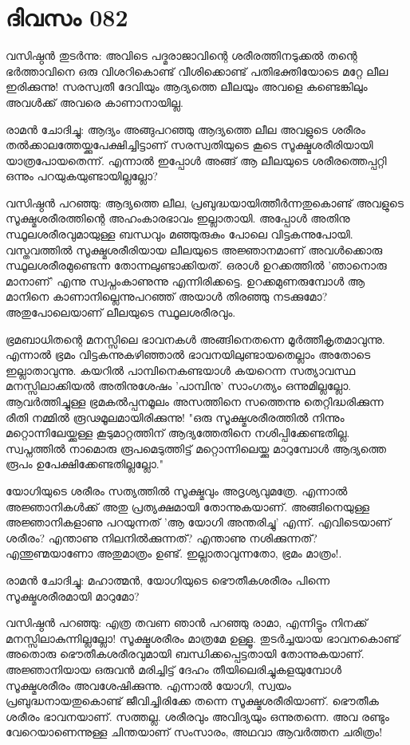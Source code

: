  
\section{ദിവസം 082}


വസിഷ്ഠന്‍ തുടര്‍ന്നു: അവിടെ പദ്മരാജാവിന്റെ ശരീരത്തിനടുക്കല്‍ തന്റെ ഭര്‍ത്താവിനെ ഒരു വിശറികൊണ്ട്‌ വീശിക്കൊണ്ട്‌ പതിഭക്തിയോടെ മറ്റേ ലീല ഇരിക്കുന്നു! സരസ്വതീ ദേവിയും ആദ്യത്തെ ലീലയും അവളെ കണ്ടെങ്കിലും അവള്‍ക്ക്‌ അവരെ കാണാനായില്ല.

രാമന്‍ ചോദിച്ചു: ആദ്യം അങ്ങുപറഞ്ഞു ആദ്യത്തെ ലീല അവളുടെ ശരീരം തല്‍ക്കാലത്തേയ്ക്കുപേക്ഷിച്ചിട്ടാണ്‌ സരസ്വതിയുടെ കൂടെ സൂക്ഷ്മശരീരിയായി യാത്രപോയതെന്ന്. എന്നാല്‍ ഇപ്പോള്‍ അങ്ങ്‌ ആ ലീലയുടെ ശരീരത്തെപ്പറ്റി ഒന്നും പറയുകയുണ്ടായില്ലല്ലോ?

വസിഷ്ഠന്‍ പറഞ്ഞു: ആദ്യത്തെ ലീല, പ്രബുദ്ധയായിത്തീര്‍ന്നതുകൊണ്ട്‌ അവളുടെ സൂക്ഷ്മശരീരത്തിന്റെ അഹംകാരഭാവം ഇല്ലാതായി. അപ്പോള്‍ അതിനു സ്ഥൂലശരീരവുമായുള്ള ബന്ധവും മഞ്ഞുരുകും പോലെ വിട്ടകന്നുപോയി. വസ്തവത്തില്‍ സൂക്ഷ്മശരീരിയായ ലീലയുടെ അജ്ഞാനമാണ്‌ അവള്‍ക്കൊരു സ്ഥൂലശരീരമുണ്ടെന്ന തോന്നലുണ്ടാക്കിയത്‌. ഒരാള്‍ ഉറക്കത്തില്‍ 'ഞാനൊരു മാനാണ്‌' എന്നു സ്വപ്നംകാണുന്നു എന്നിരിക്കട്ടെ. ഉറക്കമുണരുമ്പോള്‍ ആ മാനിനെ കാണാനില്ലെന്നുപറഞ്ഞ്‌ അയാള്‍ തിരഞ്ഞു നടക്കുമോ? അതുപോലെയാണ്‌ ലീലയുടെ സ്ഥൂലശരീരവും.

ഭ്രമബാധിതന്റെ മനസ്സിലെ ഭാവനകള്‍ അങ്ങിനെതന്നെ മൂര്‍ത്തീകൃതമാവുന്നു. എന്നാല്‍ ഭ്രമം വിട്ടകന്നുകഴിഞ്ഞാല്‍ ഭാവനയിലുണ്ടായതെല്ലാം അതോടെ ഇല്ലാതാവുന്നു. കയറില്‍ പാമ്പിനെകണ്ടയാള്‍ കയറെന്ന സത്യാവസ്ഥ മനസ്സിലാക്കിയല്‍ അതിനുശേഷം 'പാമ്പിനു' സാംഗത്യം ഒന്നുമില്ലല്ലോ. ആവര്‍ത്തിച്ചുള്ള ഭ്രമകല്‍പ്പനമൂലം അസത്തിനെ സത്തെന്നു തെറ്റിദ്ധരിക്കുന്ന രീതി നമ്മില്‍ രൂഢമൂലമായിരിക്കുന്നു! "ഒരു സൂക്ഷ്മശരീരത്തില്‍ നിന്നും മറ്റൊന്നിലേയ്ക്കുള്ള കൂടുമാറ്റത്തിന്‌ ആദ്യത്തേതിനെ നശിപ്പിക്കേണ്ടതില്ല. സ്വപ്നത്തില്‍ നാമൊരു രൂപമെടുത്തിട്ട്‌ മറ്റൊന്നിലെയ്ക്കു മാറുമ്പോള്‍ ആദ്യത്തെ രൂപം ഉപേക്ഷിക്കേണ്ടതില്ലല്ലോ." 

യോഗിയുടെ ശരീരം സത്യത്തില്‍  സൂക്ഷ്മവും അദൃശ്യവുമത്രേ. എന്നാല്‍ അജ്ഞാനികള്‍ക്ക്‌ അതു പ്രത്യക്ഷമായി തോന്നുകയാണ്‌. അങ്ങിനെയുള്ള അജ്ഞാനികളാണു പറയുന്നത്‌ 'ആ യോഗി അന്തരിച്ചു' എന്ന്. എവിടെയാണ്‌ ശരീരം? എന്താണു നിലനില്‍ക്കുന്നത്‌? എന്താണു നശിക്കുന്നത്‌? എന്തുണ്മയാണോ അതുമാത്രം ഉണ്ട്‌. ഇല്ലാതാവുന്നതോ, ഭ്രമം മാത്രം!.

രാമന്‍ ചോദിച്ചു: മഹാത്മന്‍, യോഗിയുടെ ഭൌതീകശരീരം പിന്നെ സൂക്ഷ്മശരീരമായി മാറുമോ? 

വസിഷ്ഠന്‍ പറഞ്ഞു: എത്ര തവണ ഞാന്‍ പറഞ്ഞു രാമാ, എന്നിട്ടും നിനക്ക്‌ മനസ്സിലാകുന്നില്ലല്ലോ! സൂക്ഷ്മശരീരം മാത്രമേ ഉള്ളൂ. തുടര്‍ച്ചയായ ഭാവനകൊണ്ട്‌ അതൊരു ഭൌതീകശരീരവുമായി ബന്ധിക്കപ്പെട്ടതായി തോന്നുകയാണ്‌. അജ്ഞാനിയായ ഒരുവന്‍ മരിച്ചിട്ട്‌ ദേഹം തീയിലെരിച്ചുകളയുമ്പോള്‍ സൂക്ഷ്മശരീരം അവശേഷിക്കുന്നു. എന്നാല്‍ യോഗി, സ്വയം പ്രബുദ്ധനായതുകൊണ്ട്‌ ജീവിച്ചിരിക്കേ തന്നെ സൂക്ഷ്മശരീരിയാണ്‌. ഭൌതീക ശരീരം ഭാവനയാണ്‌. സത്തല്ല. ശരീരവും അവിദ്യയും ഒന്നുതന്നെ. അവ രണ്ടും വേറെയാണെന്നുള്ള ചിന്തയാണ്‌ സംസാരം, അഥവാ ആവര്‍ത്തന ചരിത്രം! 

